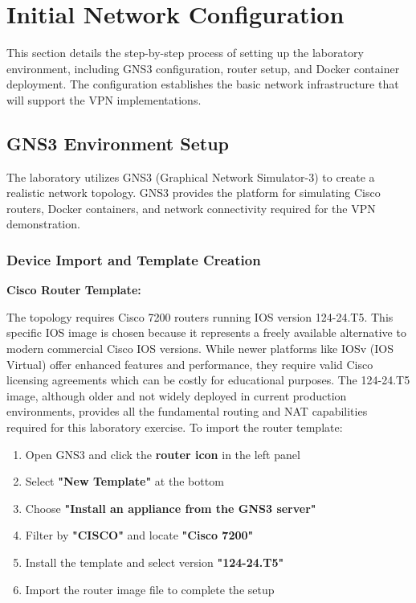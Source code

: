 \newpage

\section{Initial Network Configuration}

This section details the step-by-step process of setting up the laboratory environment, including GNS3 configuration, router setup, and Docker container deployment. The configuration establishes the basic network infrastructure that will support the VPN implementations.

\subsection{GNS3 Environment Setup}

The laboratory utilizes GNS3 (Graphical Network Simulator-3) to create a realistic network topology. GNS3 provides the platform for simulating Cisco routers, Docker containers, and network connectivity required for the VPN demonstration.

\subsubsection{Device Import and Template Creation}

\textbf{Cisco Router Template:}

\noindent
The topology requires Cisco 7200 routers running IOS version 124-24.T5. This specific IOS image is chosen because it represents a freely available alternative to modern commercial Cisco IOS versions. While newer platforms like IOSv (IOS Virtual) offer enhanced features and performance, they require valid Cisco licensing agreements which can be costly for educational purposes. The 124-24.T5 image, although older and not widely deployed in current production environments, provides all the fundamental routing and NAT capabilities required for this laboratory exercise. To import the router template:

\begin{enumerate}
    \item Open GNS3 and click the \textbf{router icon} in the left panel
    \item Select \textbf{"New Template"} at the bottom
    \item Choose \textbf{"Install an appliance from the GNS3 server"}
    \item Filter by \textbf{"CISCO"} and locate \textbf{"Cisco 7200"}
    \item Install the template and select version \textbf{"124-24.T5"}
    \item Import the router image file to complete the setup
\end{enumerate}

